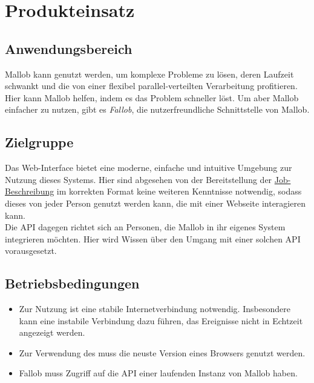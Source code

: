 \section{Produkteinsatz}

\subsection{Anwendungsbereich}

\gls{Mallob} kann genutzt werden, um komplexe Probleme zu lösen, deren Laufzeit schwankt und die von einer flexibel parallel-verteilten Verarbeitung profitieren. Hier kann \gls{Mallob} helfen, indem es das Problem schneller löst. Um aber \gls{Mallob} einfacher zu nutzen, gibt es \textit{Fallob}, die nutzerfreundliche Schnittstelle von \gls{Mallob}.

\subsection{Zielgruppe}

Das \gls{Web-Interface} bietet eine moderne, einfache und intuitive Umgebung zur Nutzung dieses Systems. Hier sind abgesehen von der Bereitstellung der \hyperref[B:Job-Beschreibung]{Job-Beschreibung} im korrekten Format keine weiteren Kenntnisse notwendig, sodass dieses von jeder Person genutzt werden kann, die mit einer Webseite interagieren  kann.\\
Die \gls{API} dagegen richtet sich an Personen, die \gls{Mallob} in ihr eigenes System integrieren möchten. Hier wird Wissen über den Umgang mit einer solchen \gls{API} vorausgesetzt.

\subsection{Betriebsbedingungen}
\begin{itemize}
    \item Zur Nutzung ist eine stabile Internetverbindung notwendig. Insbesondere kann eine instabile Verbindung dazu führen, das Ereignisse nicht in Echtzeit angezeigt werden.
    \item Zur Verwendung des  muss die neuste Version eines Browsers genutzt werden.
    \item Fallob muss Zugriff auf die \gls{API} einer laufenden Instanz von \gls{Mallob} haben.
\end{itemize}